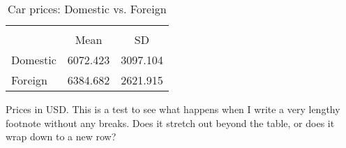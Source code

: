 \begin{table}[htbp]\centering
\begin{threeparttable}
\caption{Car prices: Domestic vs. Foreign}
\def\sym#1{\ifmmode^{#1}\else\(^{#1}\)\fi}
\begin{tabular} {l*{1}{cc}}
\toprule 
&\multicolumn{2}{c}{}          \\
& Mean & SD                            \\
\midrule
Domestic &  6072.423 &  3097.104\\
Foreign &  6384.682 &  2621.915\\
\bottomrule
\end{tabular}
\begin{tablenotes}[flushleft]
\item Prices in USD. This is a test to see what happens when I write a very lengthy footnote without any breaks. Does it stretch out beyond the table, or does it wrap down to a new row?
\end{tablenotes}
\end{threeparttable}
\end{table}